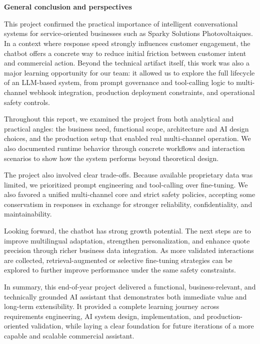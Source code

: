 
\chapter*{}
\fancyhf{}
\renewcommand{\headrulewidth}{0pt}
\renewcommand{\footrulewidth}{0pt}

\begin{center}
    \textbf{\huge{General conclusion and perspectives}}
\end{center}

This project confirmed the practical importance of intelligent conversational systems for service-oriented businesses such as Sparky Solutions Photovoltaiques. In a context where response speed strongly influences customer engagement, the chatbot offers a concrete way to reduce initial friction between customer intent and commercial action. Beyond the technical artifact itself, this work was also a major learning opportunity for our team: it allowed us to explore the full lifecycle of an LLM-based system, from prompt governance and tool-calling logic to multi-channel webhook integration, production deployment constraints, and operational safety controls.

Throughout this report, we examined the project from both analytical and practical angles: the business need, functional scope, architecture and AI design choices, and the production setup that enabled real multi-channel operation. We also documented runtime behavior through concrete workflows and interaction scenarios to show how the system performs beyond theoretical design.

The project also involved clear trade-offs. Because available proprietary data was limited, we prioritized prompt engineering and tool-calling over fine-tuning. We also favored a unified multi-channel core and strict safety policies, accepting some conservatism in responses in exchange for stronger reliability, confidentiality, and maintainability.

Looking forward, the chatbot has strong growth potential. The next steps are to improve multilingual adaptation, strengthen personalization, and enhance quote precision through richer business data integration. As more validated interactions are collected, retrieval-augmented or selective fine-tuning strategies can be explored to further improve performance under the same safety constraints.

In summary, this end-of-year project delivered a functional, business-relevant, and technically grounded AI assistant that demonstrates both immediate value and long-term extensibility. It provided a complete learning journey across requirements engineering, AI system design, implementation, and production-oriented validation, while laying a clear foundation for future iterations of a more capable and scalable commercial assistant.

\cfoot{\thepage}

\clearpage
\renewcommand{\headrulewidth}{1.5pt}
\renewcommand{\footrulewidth}{1.5pt}

\lhead{\textsl{\footnotesize{\nouppercase{\rightmark}}}}
\rhead{\textsl{\footnotesize{\nouppercase{\leftmark}}}}
\cfoot{\thepage}



